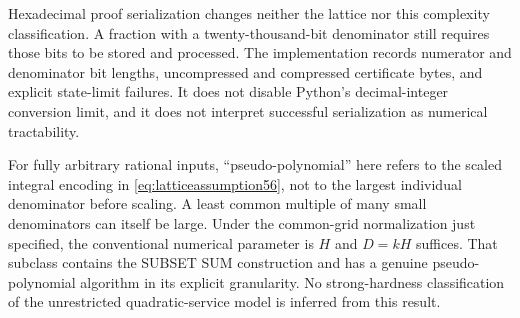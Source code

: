 Hexadecimal proof serialization changes neither the lattice nor this complexity classification. A fraction with a twenty-thousand-bit denominator still requires those bits to be stored and processed. The implementation records numerator and denominator bit lengths, uncompressed and compressed certificate bytes, and explicit state-limit failures. It does not disable Python's decimal-integer conversion limit, and it does not interpret successful serialization as numerical tractability.

For fully arbitrary rational inputs, ``pseudo-polynomial'' here refers to the scaled integral encoding in \eqref{eq:latticeassumption56}, not to the largest individual denominator before scaling. A least common multiple of many small denominators can itself be large. Under the common-grid normalization just specified, the conventional numerical parameter is $H$ and $D=kH$ suffices. That subclass contains the SUBSET SUM construction and has a genuine pseudo-polynomial algorithm in its explicit granularity. No strong-hardness classification of the unrestricted quadratic-service model is inferred from this result.
